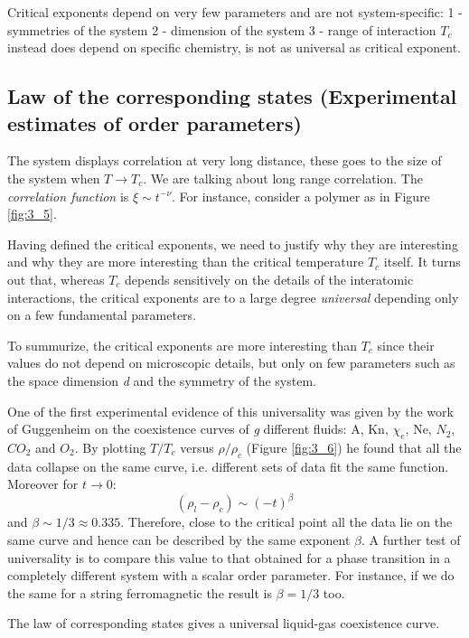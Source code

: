 \documentclass[../../Main/Main.tex]{subfiles}
\begin{document}
Critical exponents depend on very few parameters and are not system-specific:
1 - symmetries of the system
2 - dimension of the system
3 - range of interaction
$T_c$ instead does depend on specific chemistry, is not as universal as critical exponent.


\subsection{Law of the corresponding states (Experimental estimates of order parameters)}
The system displays correlation at very long distance, these goes to the size of the system when \( T \rightarrow T_c \). We are talking about long range correlation. The \emph{correlation function} is \( \xi \sim t^{-\nu } \).
For instance, consider a polymer as in Figure \ref{fig:3_5}.

Having defined the critical exponents, we need to justify why they are interesting and  why they are more interesting than the critical temperature \( T_c \) itself. It turns out that, whereas \( T_c \) depends sensitively on the details of the interatomic interactions, the critical exponents are to a large degree \emph{universal} depending only on a few fundamental parameters.

To summurize, the critical exponents are more interesting than \( T_c \) since their values do not depend on microscopic details, but only on few parameters such as the space dimension \emph{d} and the symmetry of the system.

One of the first experimental evidence of this universality was given by the work of Guggenheim on the coexistence curves of \emph{g} different fluids: A, Kn, $\chi_e$, Ne, $N_2$, $CO_2$ and $O_2$. By plotting \( T/T_c \) versus \( \rho /\rho _c \) (Figure \ref{fig:3_6}) he found that all the data collapse on the same curve, i.e. different sets of data fit the  same function. Moreover for \( t \rightarrow 0 \):
\begin{equation*}
  (\rho _l - \rho _c) \sim (-t)^{\beta}
  \label{eq:}
\end{equation*}
and \( \beta \sim 1/3 \approx 0.335 \).  Therefore, close to the critical point all the data lie on the same curve and hence can be described by the same exponent \( \beta  \).
A further test of universality is to compare this value to that obtained for a phase transition in a completely different system with a scalar order parameter. For instance, if we do the same for a string ferromagnetic the result is \( \beta = 1/3 \)  too.
\begin{remark}
The law of corresponding states gives a universal liquid-gas coexistence curve.
\end{remark}
\end{document}

